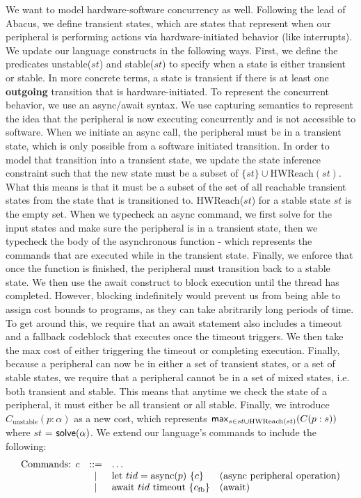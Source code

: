 We want to model hardware-software concurrency as well. Following the lead of Abacus, we define transient states, which are states that represent when our peripheral is performing actions via hardware-initiated behavior (like interrupts). We update our language constructs in the following ways. First, we define the predicates unstable($st$) and stable($st$) to specify when a state is either transient or stable. In more concrete terms, a state is transient if there is at least one \textbf{outgoing} transition that is hardware-initiated. To represent the concurrent behavior, we use an async/await syntax. We use capturing semantics to represent the idea that the peripheral is now executing concurrently and is not accessible to software. When we initiate an async call, the peripheral must be in a transient state, which is only possible from a software initiated transition. In order to model that transition into a transient state, we update the state inference constraint such that the new state must be a subset of $\{st\} \cup \text{HWReach}(st)$. What this means is that it must be a subset of the set of all reachable transient states from the state that is transitioned to. HWReach($st$) for a stable state $st$ is the empty set. When we typecheck an async command, we first solve for the input states and make sure the peripheral is in a transient state, then we typecheck the body of the asynchronous function - which represents the commands that are executed while in the transient state. Finally, we enforce that once the function is finished, the peripheral must transition back to a stable state. We then use the await construct to block execution until the thread has completed. However, blocking indefinitely would prevent us from being able to assign cost bounds to programs, as they can take abritrarily long periods of time. To get around this, we require that an await statement also includes a timeout and a fallback codeblock that executes once the timeout triggers. We then take the max cost of either triggering the timeout or completing execution. Finally, because a peripheral can now be in either a set of transient states, or a set of stable states, we require that a peripheral cannot be in a set of mixed states, i.e. both transient and stable. This means that anytime we check the state of a peripheral, it must either be all transient or all stable. Finally, we introduce $C_\text{unstable}(p : \alpha)$ as a new cost, which represents $\mathsf{max}_{s \in st \cup \text{HWReach(}st\text{)}}(C(p : s))$ where $st$ = $\mathsf{solve}(\alpha)$. We extend our language's commands to include the following:
\[
\begin{array}{lcll}
\text{Commands: }c & ::= & \dots \\ 
  & \,|\, &\text{let } tid = \text{async}(p) \ \{c\} & \text{(async peripheral operation)} \\ & \,|\, & \text{await } tid \text{ timeout } \{c_\text{fb}\} & \text{(await)} 
\end{array}
\]

